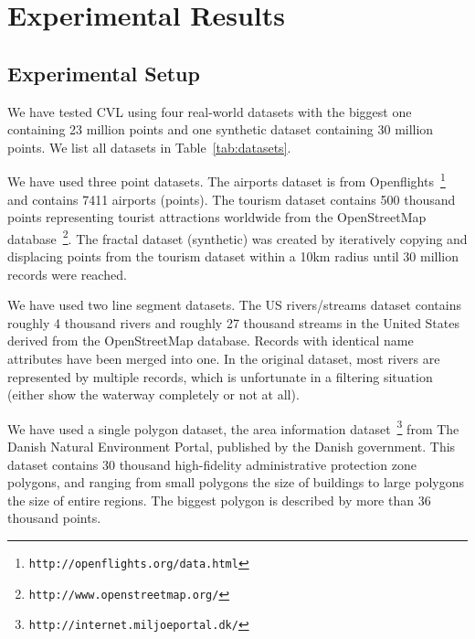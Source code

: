 \section{Experimental Results}
\label{sec:experimental}


\subsection{Experimental Setup}

We have tested CVL using four real-world datasets with the biggest one containing 23 million points and one synthetic dataset containing 30 million points. We list all datasets in Table~\ref{tab:datasets}. 

We have used three point datasets. The airports dataset is from Openflights~\footnote{\texttt{http://openflights.org/data.html}} and contains 7411 airports (points). The tourism dataset contains 500 thousand points representing tourist attractions worldwide from the OpenStreetMap database~\footnote{\texttt{http://www.openstreetmap.org/}}. The fractal dataset (synthetic) was created by iteratively copying and displacing points from the tourism dataset within a 10km radius until 30 million records were reached. 

We have used two line segment datasets. The US rivers/streams dataset contains roughly 4 thousand rivers and roughly 27 thousand streams in the United States derived from the OpenStreetMap database. Records with identical name attributes have been merged into one. In the original dataset, most rivers are represented by multiple records, which is unfortunate in a filtering situation (either show the waterway completely or not at all). 

We have used a single polygon dataset, the area information dataset~\footnote{\texttt{http://internet.miljoeportal.dk/}} from The Danish Natural Environment Portal, published by the Danish government. This dataset contains 30 thousand high-fidelity administrative protection zone polygons, and ranging from small polygons the size of buildings to large polygons the size of entire regions. The biggest polygon is described by more than 36 thousand points.

